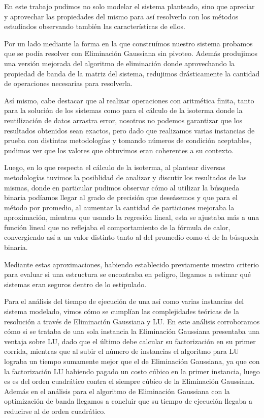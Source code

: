 \setlength{\parindent}{15.0pt} %
En este trabajo pudimos no solo modelar el sistema planteado, sino que
apreciar y aprovechar las propiedades del mismo para así resolverlo con los
métodos estudiados observando también las características de ellos.

Por un lado mediante la forma en la que construímos nuestro sistema probamos
que se podía resolver con Eliminación Gaussiana sin pivoteo. Además produjimos
una versión mejorada del algoritmo de eliminación donde aprovechando la
propiedad de banda de la matriz del sistema, redujimos drásticamente la
cantidad de operaciones necesarias para resolverla.

Así mismo, cabe destacar que al realizar operaciones con aritmética finita,
tanto para la solución de los sistemas como para el cálculo de la isoterma donde
 la reutilización de datos arrastra error, nosotros no podemos
garantizar que los resultados obtenidos sean exactos, pero dado que
realizamos varias instancias de prueba con distintas
metodologías y tomando números de condición aceptables, pudimos ver que los
valores que obtuvimos eran coherentes a su contexto.

Luego, en lo que respecta el cálculo de la isoterma, al plantear diversas
metodologías tuvimos la posiblidad de analizar y discutir los resultados de las
mismas, donde en particular pudimos observar cómo al utilizar la búsqueda
binaria podíamos llegar al grado de precisión que deseásemos y que para el
método por promedio, al aumentar la cantidad de particiones mejoraba la
aproximación, mientras que usando la regresión lineal, esta se ajustaba más a
una función lineal que no reflejaba el comportamiento de la fórmula de calor,
convergiendo así a un valor distinto tanto al del promedio como el de la
búsqueda binaria.

Mediante estas aproximaciones, habiendo establecido previamente nuestro
criterio para evaluar si una estructura se encontraba en peligro, llegamos a
estimar qué sistemas eran seguros dentro de lo estipulado.

Para el análisis del tiempo de ejecución de una así como
varias instancias del sistema modelado, vimos cómo se cumplían las complejidades
teóricas de la resolución a través de Eliminación Gaussiana y LU. En este
análisis corroboramos cómo si se trataba de una sola instancia la Eliminación
Gaussiana presentaba una ventaja sobre LU, dado que el último debe calcular su
factorización en su primer corrida, mientras que al subir el número de
instancias el algoritmo para LU lograba un tiempo sumamente mejor que el de
Eliminación Gaussiana, ya que con la factorización LU habiendo pagado un costo
cúbico en la primer instancia, luego es es del orden cuadrático contra el
siempre cúbico de la Eliminación Gaussiana. Además en el análisis para el
algoritmo de Eliminación Gaussiana con la optimización de banda llegamos a
concluir que su tiempo de ejecución llegaba a reducirse al de orden cuadrático.

